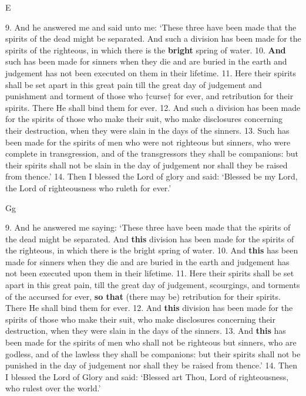 E

9. And he answered
me and said unto me:
‘These three have been
made that the spirits
of the dead might be
separated. And such a
division has been made
for the spirits of the
righteous, in which there
is the \textbf{bright} spring of
water. 10. \textbf{And} such has
been made for sinners
when they die and are
buried in the earth and
judgement has not been
executed on them in
their lifetime. 11. Here
their spirits shall be set
apart in this great pain
till the great day of
judgement and punishment
and torment of
those who †curse† for
ever, and retribution for
their spirits. There He
shall bind them for ever.
12. And such a division
has been made for the
spirits of those who make
their suit, who make disclosures
concerning their
destruction, when they
were slain in the days
of the sinners. 13. Such
has been made for the
spirits of men who were
not righteous but sinners,
who were complete in
transgression, and of the
transgressors they shall
be companions: but
their spirits shall not
be slain in the day of
judgement nor shall they
be raised from thence.’
14. Then I blessed the
Lord of glory and said:
‘Blessed be my Lord,
the Lord of righteousness
who ruleth for ever.’

Gg

9. And he answered
me saying: ‘These three
have been made that
the spirits of the dead
might be separated. And
\textbf{this} division has been
made for the spirits
of the righteous, in which
there is the bright spring
of water. 10. And \textbf{this}
has been made for sinners
when they die and are
buried in the earth and
judgement has not been
executed upon them in
their lifetime. 11. Here
their spirits shall be set
apart in this great pain,
till the great day of
judgement, scourgings,
and torments of the accursed
for ever, \textbf{so that}
(there may be) retribution
for their spirits.
There He shall bind them
for ever. 12. And \textbf{this}
division has been made
for the spirits of those
who make their suit,
who make disclosures
concerning their destruction,
when they were
slain in the days of the
sinners. 13. And \textbf{this}
has been made for the
spirits of men who shall
not be righteous but sinners,
who are godless,
and of the lawless they
shall be companions: but
their spirits shall not be
punished in the day of
judgement nor shall they
be raised from thence.’
14. Then I blessed the
Lord of Glory and said:
‘Blessed art Thou, Lord
of righteousness, who
rulest over the world.’


